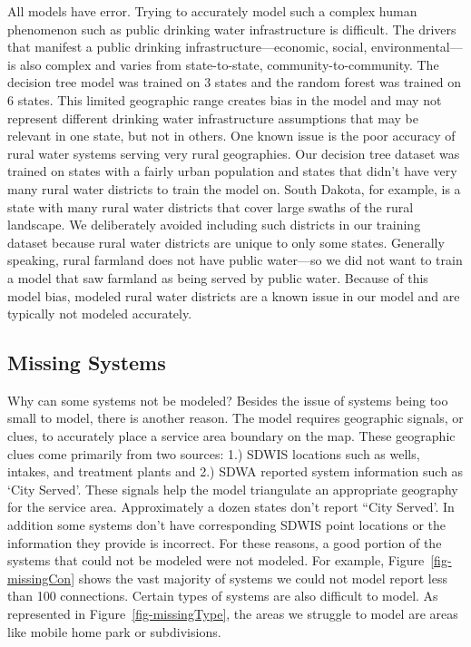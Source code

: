 \documentclass[
  letterpaper,
  DIV=11,
  numbers=noendperiod,
  oneside]{scrartcl}
\begin{document}
All models have error. Trying to accurately model such a complex human
phenomenon such as public drinking water infrastructure is difficult.
The drivers that manifest a public drinking infrastructure---economic,
social, environmental---is also complex and varies from state-to-state,
community-to-community. The decision tree model was trained on 3 states
and the random forest was trained on 6 states. This limited geographic
range creates bias in the model and may not represent different drinking
water infrastructure assumptions that may be relevant in one state, but
not in others. One known issue is the poor accuracy of rural water
systems serving very rural geographies. Our decision tree dataset was
trained on states with a fairly urban population and states that didn't
have very many rural water districts to train the model on. South
Dakota, for example, is a state with many rural water districts that
cover large swaths of the rural landscape. We deliberately avoided
including such districts in our training dataset because rural water
districts are unique to only some states. Generally speaking, rural
farmland does not have public water---so we did not want to train a
model that saw farmland as being served by public water. Because of this
model bias, modeled rural water districts are a known issue in our model
and are typically not modeled accurately.

\subsection{Missing Systems}\label{missing-systems}

Why can some systems not be modeled? Besides the issue of systems being
too small to model, there is another reason. The model requires
geographic signals, or clues, to accurately place a service area
boundary on the map. These geographic clues come primarily from two
sources: 1.) SDWIS locations such as wells, intakes, and treatment
plants and 2.) SDWA reported system information such as `City Served'.
These signals help the model triangulate an appropriate geography for
the service area. Approximately a dozen states don't report ``City
Served'. In addition some systems don't have corresponding SDWIS point
locations or the information they provide is incorrect. For these
reasons, a good portion of the systems that could not be modeled were
not modeled. For example, Figure~\ref{fig-missingCon} shows the vast
majority of systems we could not model report less than 100 connections.
Certain types of systems are also difficult to model. As represented in
Figure~\ref{fig-missingType}, the areas we struggle to model are areas
like mobile home park or subdivisions.
\end{document}
